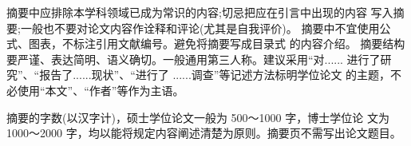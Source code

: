 \begin{cabstract}

摘要中应排除本学科领域已成为常识的内容;切忌把应在引言中出现的内容 写入摘要;一般也不要对论文内容作诠释和评论(尤其是自我评价)。
摘要中不宜使用公式、图表，不标注引用文献编号。避免将摘要写成目录式 的内容介绍。
摘要结构要严谨、表达简明、语义确切。一般通用第三人称。建议采用“对...... 进行了研究”、“报告了......现状”、“进行了
......调查”等记述方法标明学位论文 的主题，不必使用“本文”、“作者”等作为主语。

摘要的字数(以汉字计)，硕士学位论文一般为
500～1000 字，博士学位论 文为 1000～2000 字，均以能将规定内容阐述清楚为原则。摘要页不需写出论文题目。



\end{cabstract}
